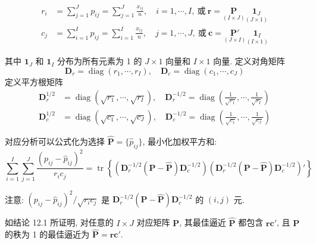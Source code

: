 
\label{eq:12-29}
\begin{equation}
\begin{aligned}
r_i&=\sum_{j=1}^{J}p_{ij}=\sum_{j=1}^{J}\frac{x_{ij}}{n},\quad i=1,\cdots,I,\ \text{或}\
\mathbf{r}=\underset{(I\times J)}{\mathbf{P}}\underset{(J\times 1)}{\mathbf{1}_J}\\
c_j&=\sum_{i=1}^{I}p_{ij}=\sum_{i=1}^{I}\frac{x_{ij}}{n},\quad j=1,\cdots,J,\ \text{或}\
\mathbf{c}=\underset{(J\times I)}{\mathbf{P}'}\underset{(I\times 1)}{\mathbf{1}_I}
\end{aligned}
\tag{12-29}
\end{equation}

其中 $\mathbf{1}_J$ 和 $\mathbf{1}_I$ 分布为所有元素为 1 的 $J\times 1$ 向量和 $I\times 1$ 向量. 定义对角矩阵
\label{eq:12-30}
\begin{equation}
\mathbf{D}_r=\operatorname{diag}(r_1,\cdots,r_I),\quad
\mathbf{D}_c=\operatorname{diag}(c_1,\cdots,c_J)
\tag{12-30}
\end{equation}
定义平方根矩阵
\label{eq:12-31}
\begin{equation}
\begin{aligned}
\mathbf{D}_r^{1/2}&=\operatorname{diag}(\sqrt{r_1},\cdots,\sqrt{r_I}),\quad
\mathbf{D}_r^{-1/2}=\operatorname{diag}\left(\frac{1}{\sqrt{r_1}},\cdots,\frac{1}{\sqrt{r_I}}\right)\\
\mathbf{D}_c^{1/2}&=\operatorname{diag}(\sqrt{c_1},\cdots,\sqrt{c_J}),\quad
\mathbf{D}_c^{-1/2}=\operatorname{diag}\left(\frac{1}{\sqrt{c_1}},\cdots,\frac{1}{\sqrt{c_J}}\right)
\end{aligned}
\tag{12-31}
\end{equation}

对应分析可以公式化为选择 $\hat{\mathbf{P}}=\{\hat{p}_{ij}\}$, 最小化加权平方和:
\label{eq:12-32}
\begin{equation}
\sum_{i=1}^{I}\sum_{j=1}^{J}\frac{(p_{ij}-\hat{p}_{ij})^2}{r_ic_j}
=\operatorname{tr}\left\{(\mathbf{D}_r^{-1/2}(\mathbf{P}-\hat{\mathbf{P}})\mathbf{D}_c^{-1/2})
(\mathbf{D}_r^{-1/2}(\mathbf{P}-\hat{\mathbf{P}})\mathbf{D}_c^{-1/2})'\right\}
\tag{12-32}
\end{equation}

注意: $(p_{ij}-\hat{p}_{ij})^2/\sqrt{r_ic_j}$ 是 $\mathbf{D}_r^{-1/2}(\mathbf{P}-\hat{\mathbf{P}})\mathbf{D}_c^{-1/2}$ 的 $(i,j)$ 元.

如结论 12.1 所证明, 对任意的 $I\times J$ 对应矩阵 $\mathbf{P}$, 其最佳逼近 $\hat{\mathbf{P}}$ 都包含 $\mathbf{r}\mathbf{c}'$, 且 $\mathbf{P}$ 的秩为 1 的最佳逼近为 $\hat{\mathbf{P}}=\mathbf{r}\mathbf{c}'$.

